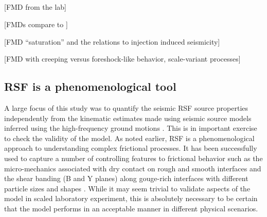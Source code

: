 \documentclass[preprint,1p, 10pt,authoryear]{elsarticle}
\begin{document}
\subsection{}
[FMD from the lab]

[FMDs compare to \citet{Villiger2019}]

[FMD ``saturation'' and the relations to injection induced seismicity]

[FMD with creeping versus foreshock-like behavior, scale-variant processes]




\subsection{RSF is a phenomenological tool}

A large focus of this study was to quantify the seismic RSF source properties independently from the kinematic estimates made using seismic source models inferred using the high-frequency ground motions \citep{Selvadurai2019}. This is in important exercise to check the validity of the model. As noted earlier, RSF is a phenomenological approach to understanding complex frictional processes.  It has been successfully used to capture a number of controlling features to frictional behavior such as the micro-mechanics associated with dry contact on rough and smooth interfaces \citep{Marone1973, Marone1998,Dieterich1981,Yoshioka1997} and the shear banding (B and Y planes) along gouge-rich interfaces with different particle sizes and shapes \citep{Marone1993, Anthony2005,Scuderi2017}. While it may seem trivial to validate aspects of the model in scaled laboratory experiment, this is absolutely necessary to be certain that the model performs in an acceptable manner in different physical scenarios. 
\end{document}
